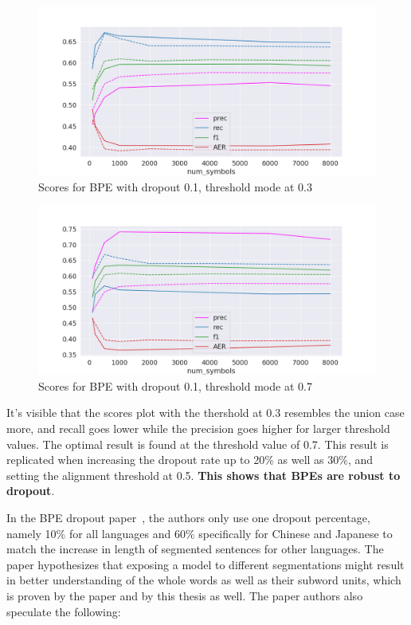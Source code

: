 \begin{figure}[!ht]
    \centering
    \includegraphics[width=11.5cm]{../reports/scores_dropout_bpe/space/0.1/0.3_thres_fastalign.png}
    \caption{Scores for BPE with dropout 0.1, threshold mode at 0.3}
\end{figure}

\begin{figure}[!ht]
    \centering
    \includegraphics[width=11.5cm]{../reports/scores_dropout_bpe/space/0.1/0.7_thres_fastalign.png}
    \caption{Scores for BPE with dropout 0.1, threshold mode at 0.7}
\end{figure}

It's visible that the scores plot with the thershold at 0.3 resembles the union case more, and recall goes lower while the precision goes higher for larger threshold values. The optimal result is found at the threshold value of 0.7. This result is replicated when increasing the dropout rate up to 20\% as well as 30\%, and setting the alignment threshold at 0.5. \textbf{This shows that BPEs are robust to dropout}.

In the BPE dropout paper~\cite{provilkov2019bpedropout}, the authors only use one dropout percentage, namely 10\% for all languages and 60\% specifically for Chinese and Japanese to match the increase in length of segmented sentences for other languages. The paper hypothesizes that exposing a model to different segmentations might result in better understanding of the whole words as well as their subword units, which is proven by the paper and by this thesis as well. The paper authors also speculate the following:

